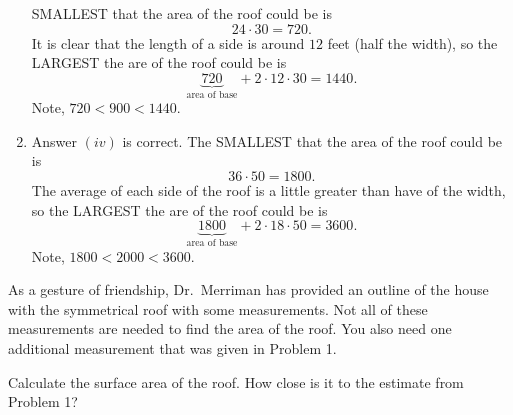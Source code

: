 \documentclass[handout,nooutcomes,noauthor,hints]{ximera}
\begin{document}
\begin{question}
\begin{freeResponse}
\begin{enumerate}
      SMALLEST that the area of the roof could be is
      \[
      24\cdot 30 = 720.
      \]
      It is clear that the length of a side is around $12$ feet (half the width), so
      the LARGEST the are of the roof could be is
      \[
      \underbrace{720}_{\text{area of base}} + 2\cdot 12\cdot 30 = 1440.
      \]
      Note, $720 < 900 < 1440$.
    \item Answer $(iv)$ is correct.  The SMALLEST that the area of the
      roof could be is
      \[
      36\cdot 50 = 1800.
      \]
      The average of each side of the roof is a little greater than
      have of the width, so the LARGEST the are of the roof could be
      is
      \[
      \underbrace{1800}_{\text{area of base}} + 2\cdot 18\cdot 50 = 3600.
      \]
      Note, $1800 < 2000 < 3600$.
    \end{enumerate}
  \end{freeResponse}
\end{question}
\mynewpage


\begin{question}
 As a gesture of friendship, Dr.\ Merriman has provided an outline of
 the house with the symmetrical roof with some measurements. Not all
 of these measurements are needed to find the area of the roof. You
 also need one additional measurement that was given in Problem 1.
 \begin{center}
\end{center}
Calculate the surface area of the roof. How close is it to the
estimate from Problem 1?
\end{question}
\end{document}
